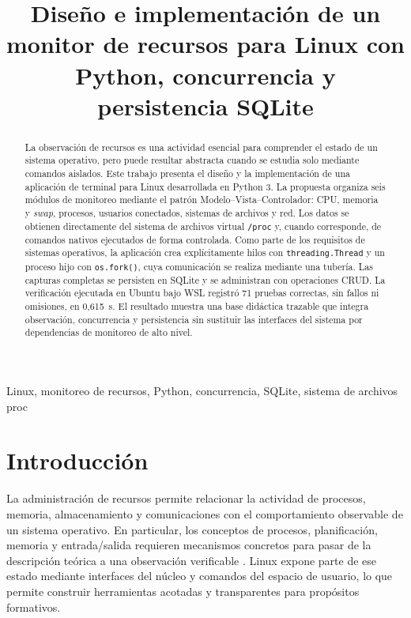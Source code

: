 \documentclass[conference]{IEEEtran}
\title{Dise\~no e implementaci\'on de un monitor de recursos para Linux con Python, concurrencia y persistencia SQLite}
\author{
\IEEEauthorblockN{Julio Cesar Blacio Machuca \qquad Ariel Jose Llumiquinga \~Nacato}
\IEEEauthorblockA{Carrera de Ingenier\'ia de Software\\
Universidad de las Fuerzas Armadas ESPE\\
Sangolqu\'i, Ecuador}
}
\begin{document}
\maketitle

\begin{abstract}
La observaci\'on de recursos es una actividad esencial para comprender el estado de un sistema operativo, pero puede resultar abstracta cuando se estudia solo mediante comandos aislados. Este trabajo presenta el dise\~no y la implementaci\'on de una aplicaci\'on de terminal para Linux desarrollada en Python 3. La propuesta organiza seis m\'odulos de monitoreo mediante el patr\'on Modelo--Vista--Controlador: CPU, memoria y \textit{swap}, procesos, usuarios conectados, sistemas de archivos y red. Los datos se obtienen directamente del sistema de archivos virtual \texttt{/proc} y, cuando corresponde, de comandos nativos ejecutados de forma controlada. Como parte de los requisitos de sistemas operativos, la aplicaci\'on crea expl\'icitamente hilos con \texttt{threading.Thread} y un proceso hijo con \texttt{os.fork()}, cuya comunicaci\'on se realiza mediante una tuber\'ia. Las capturas completas se persisten en SQLite y se administran con operaciones CRUD. La verificaci\'on ejecutada en Ubuntu bajo WSL registr\'o 71 pruebas correctas, sin fallos ni omisiones, en 0,615~s. El resultado muestra una base did\'actica trazable que integra observaci\'on, concurrencia y persistencia sin sustituir las interfaces del sistema por dependencias de monitoreo de alto nivel.
\end{abstract}

\begin{IEEEkeywords}
Linux, monitoreo de recursos, Python, concurrencia, SQLite, sistema de archivos proc
\end{IEEEkeywords}

\section{Introducci\'on}
La administraci\'on de recursos permite relacionar la actividad de procesos, memoria, almacenamiento y comunicaciones con el comportamiento observable de un sistema operativo. En particular, los conceptos de procesos, planificaci\'on, memoria y entrada/salida requieren mecanismos concretos para pasar de la descripci\'on te\'orica a una observaci\'on verificable \cite{silberschatz2019}. Linux expone parte de ese estado mediante interfaces del n\'ucleo y comandos del espacio de usuario, lo que permite construir herramientas acotadas y transparentes para prop\'ositos formativos.
\end{document}
